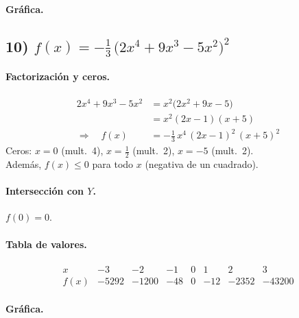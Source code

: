 \documentclass[12pt,a4paper]{article}
\begin{document}
	\paragraph{Gráfica.}
	
	\bigskip
	
	\subsection*{10) \(\displaystyle f(x)=-\frac{1}{3}\,\bigl(2x^{4}+9x^{3}-5x^{2}\bigr)^{2}\)}
	\paragraph{Factorización y ceros.}
	\begin{align*}
		2x^{4}+9x^{3}-5x^{2} &= x^{2}\bigl(2x^{2}+9x-5\bigr)\\
		&= x^{2}(2x-1)(x+5) \\
		\Rightarrow\quad f(x) &= -\frac{1}{3}\,x^{4}\,(2x-1)^{2}\,(x+5)^{2}
	\end{align*}
	Ceros: \(x=0\) (mult.\ 4), \(x=\tfrac{1}{2}\) (mult.\ 2), \(x=-5\) (mult.\ 2). \\
	Además, \(f(x)\le 0\) para todo \(x\) (negativa de un cuadrado).
	
	\paragraph{Intersección con \(Y\).} \(f(0)=0\).
	
	\paragraph{Tabla de valores.}
	\[
	\begin{array}{c|rrrrrrr}
		x & -3 & -2 & -1 & 0 & 1 & 2 & 3\\\hline
		f(x) & -5292 & -1200 & -48 & 0 & -12 & -2352 & -43200
	\end{array}
	\]
	
	\paragraph{Gráfica.}
	
\end{document}
